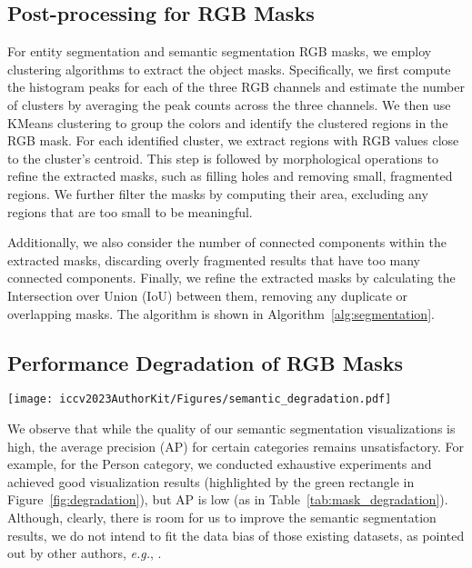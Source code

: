 \subsection{Post-processing for RGB Masks}
For entity segmentation and semantic segmentation RGB masks, we employ clustering algorithms to extract the object masks. Specifically, we first compute the histogram peaks for each of the three RGB channels and estimate the number of clusters by averaging the peak counts across the three channels. We then use KMeans clustering to group the colors and identify the clustered regions in the RGB mask.
For each identified cluster, we extract regions with RGB values close to the cluster's centroid. This step is followed by morphological operations to refine the extracted masks, such as filling holes and removing small, fragmented regions. We further filter the masks by computing their area, excluding any regions that are too small to be meaningful.

Additionally, we also consider the number of connected components within the extracted masks, discarding overly fragmented results that have too many connected components. Finally, we refine the extracted masks by calculating the Intersection over Union (IoU) between them, removing any duplicate or overlapping masks. The algorithm is shown in Algorithm~\ref{alg:segmentation}.

\subsection{Performance Degradation of RGB Masks}
\label{appendix:mask_degradation}
\begin{figure*}[htbp]
  \centering
  \texttt{[image: iccv2023AuthorKit/Figures/semantic\_degradation.pdf]}
  \caption{
   When post-processing RGB masks, small regions and excessive numbers of objects lead to significant metric degradation.
  }
  \label{fig:degradation}
\end{figure*}



We observe that while the quality of our semantic segmentation visualizations is high, the average precision (AP) for certain categories remains unsatisfactory.
For example, for the Person category, we conducted exhaustive experiments and achieved good visualization results (highlighted by the green rectangle in Figure~\ref{fig:degradation}), but AP is low (as in Table~\ref{tab:mask_degradation}).
Although, clearly, there is room for us to improve the semantic segmentation results, we do not intend to fit the data bias of those existing datasets, as pointed out by other authors, \textit{e.g.}, \cite{ravi2024sam}.  

